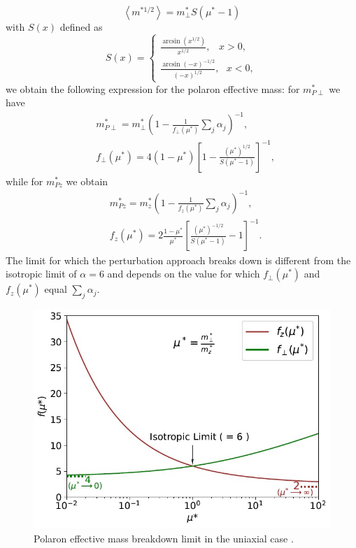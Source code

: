 \begin{equation}
    \left\langle m^{*1/2}\right\rangle=m^*_\perp S(\mu^*-1)
\end{equation}
with $S(x)$ defined as 
\begin{equation}
    S(x)=\begin{cases}
        \frac{\arcsin{(x^{1/2})}}{x^{1/2}},\hspace{10pt}x>0,\\
        \frac{\arcsin{(-x)^{-1/2}}}{(-x)^{1/2}},\hspace{8pt}x<0,
    \end{cases}
\end{equation}
we obtain the following expression for the polaron effective mass: for $m^*_{P\perp}$ we have
\begin{equation}
    \begin{split}
        &m^*_{P\perp}=m^*_{\perp}\left(1-\frac{1}{f_\perp(\mu^*)}\sum_j\alpha_{j}\right)^{-1},\\
        &f_\perp(\mu^*)=4(1-\mu^*)\left[1-\frac{(\mu^*)^{1/2}}{S(\mu^*-1)}\right]^{-1},
    \end{split}
\end{equation}
while for $m^*_{Pz}$ we obtain
\begin{equation}
\begin{split}
    &m^*_{Pz}=m^*_z\left(1-\frac{1}{f_z(\mu^*)}\sum_j\alpha_j\right)^{-1},\\
    &f_z(\mu^*)=2\frac{1-\mu^*}{\mu^*}\left[\frac{(\mu^*)^{-1/2}}{S(\mu^*-1)}-1\right]^{-1}.
\end{split}
\end{equation}
The limit for which the perturbation approach breaks down is different from the isotropic limit of $\alpha=6$ \cite{guster2021frohlich} and depends on the value 
for which $f_\perp(\mu^*)$ and $f_z(\mu^*)$ equal $\sum_j\alpha_j$.
\begin{figure}[H]
    \centering
    \includegraphics[scale=0.75]{polaron_mass_bd_guster.jpg}
    \caption{Polaron effective mass breakdown limit in the uniaxial case \cite{guster2021frohlich}.}
    \label{fig:polaron_eff_mass_bd_guster}
\end{figure}
